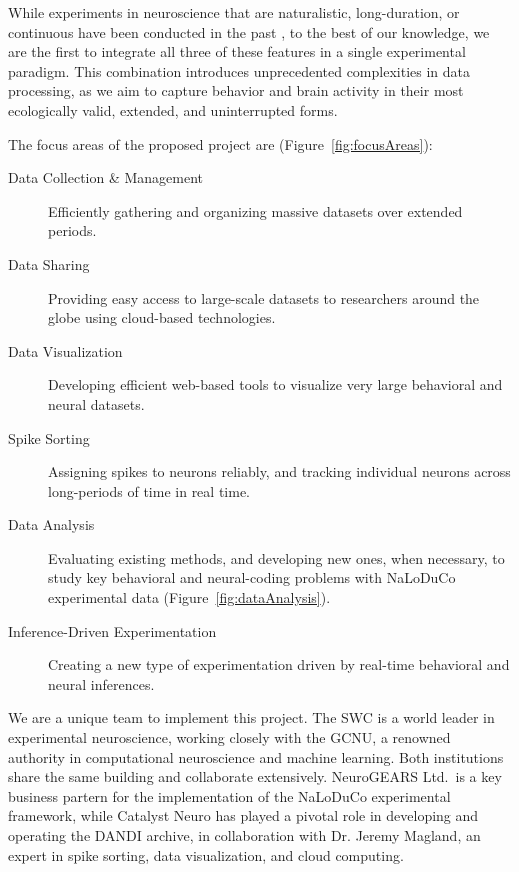 While experiments in neuroscience that are naturalistic, long-duration, or
continuous have been conducted in the past
\citep[e.g.,][]{jhuangEtAl10,maoEtAl21,volohEtAl23}, to the best of our
knowledge, we are the first to integrate all three of these features in a
single experimental paradigm.
%
This combination introduces unprecedented complexities in data processing, as
we aim to capture behavior and brain activity in their most ecologically valid,
extended, and uninterrupted forms.

The focus areas of the proposed project are (Figure~\ref{fig:focusAreas}):

\begin{description}

    \item[Data Collection \& Management] Efficiently gathering and organizing
        massive datasets over extended periods.

    \item[Data Sharing] Providing easy access to large-scale datasets
        to researchers around the globe using cloud-based technologies.

    \item[Data Visualization] Developing efficient web-based tools to visualize
        very large behavioral and neural datasets.

    \item[Spike Sorting] Assigning spikes to neurons reliably, and tracking
        individual neurons across long-periods of time in real time.

    \item[Data Analysis] Evaluating existing methods, and developing new ones,
        when necessary, to study key behavioral and neural-coding problems with
        NaLoDuCo experimental data (Figure~\ref{fig:dataAnalysis}).

    \item[Inference-Driven Experimentation] Creating a new type of
        experimentation driven by real-time behavioral and neural inferences.

\end{description}

We are a unique team to implement this project.
%
The SWC is a world leader in experimental neuroscience, working closely with
the GCNU, a renowned authority in computational neuroscience and machine
learning. Both institutions share the same building and collaborate
extensively.
%
NeuroGEARS Ltd.\ is a key business partern for the implementation of the NaLoDuCo
experimental framework,
%
while Catalyst Neuro has played a pivotal role in developing and operating the
DANDI archive,
%
in collaboration with Dr. Jeremy Magland, an expert in spike sorting, data
visualization, and cloud computing.

